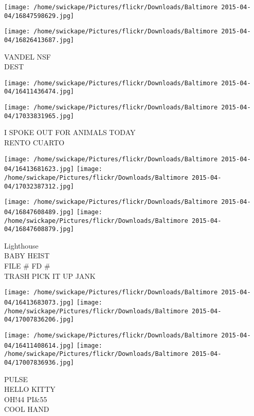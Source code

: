 \documentclass[10pt,letterpaper]{article}
\begin{document}
\texttt{[image: /home/swickape/Pictures/flickr/Downloads/Baltimore 2015-04-04/16847598629.jpg]}

\vspace{0.25in}
\texttt{[image: /home/swickape/Pictures/flickr/Downloads/Baltimore 2015-04-04/16826413687.jpg]}

VANDEL NSF\\
DEST\\
\pagebreak

\texttt{[image: /home/swickape/Pictures/flickr/Downloads/Baltimore 2015-04-04/16411436474.jpg]}

\vspace{0.25in}
\texttt{[image: /home/swickape/Pictures/flickr/Downloads/Baltimore 2015-04-04/17033831965.jpg]}

I SPOKE OUT FOR ANIMALS TODAY\\
RENTO CUARTO\\
\pagebreak

\texttt{[image: /home/swickape/Pictures/flickr/Downloads/Baltimore 2015-04-04/16413681623.jpg]}
\texttt{[image: /home/swickape/Pictures/flickr/Downloads/Baltimore 2015-04-04/17032387312.jpg]}

\texttt{[image: /home/swickape/Pictures/flickr/Downloads/Baltimore 2015-04-04/16847608489.jpg]}
\texttt{[image: /home/swickape/Pictures/flickr/Downloads/Baltimore 2015-04-04/16847608879.jpg]}

Lighthouse\\
BABY HEIST\\
FILE \# FD \#\\
TRASH PICK IT UP JANK\\
\pagebreak

\texttt{[image: /home/swickape/Pictures/flickr/Downloads/Baltimore 2015-04-04/16413683073.jpg]}
\texttt{[image: /home/swickape/Pictures/flickr/Downloads/Baltimore 2015-04-04/17007836206.jpg]}

\texttt{[image: /home/swickape/Pictures/flickr/Downloads/Baltimore 2015-04-04/16411408614.jpg]}
\texttt{[image: /home/swickape/Pictures/flickr/Downloads/Baltimore 2015-04-04/17007836936.jpg]}

PULSE\\
HELLO KITTY\\
OH!44 PI\&55\\
COOL HAND\\
\pagebreak
\end{document}
